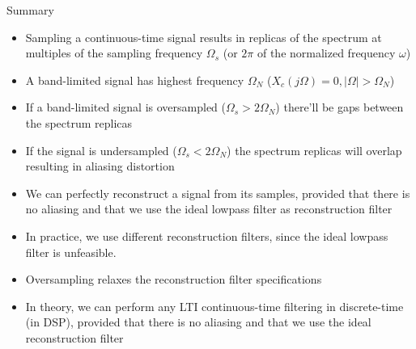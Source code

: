 \documentclass[10pt]{beamer}
\begin{document}
\begin{frame}{Summary}
\begin{itemize}
	\item Sampling a continuous-time signal results in replicas of the spectrum at multiples of the sampling frequency $\Omega_s$ (or $2\pi$ of the normalized frequency $\omega$)
	\item A band-limited signal has highest frequency $\Omega_N$ ($X_c(j\Omega) = 0, |\Omega| > \Omega_N$)
	\item If a band-limited signal is oversampled ($\Omega_s > 2\Omega_N$) there'll be gaps between the spectrum replicas
	\item If the signal is undersampled ($\Omega_s < 2\Omega_N$) the spectrum replicas will overlap resulting in aliasing distortion
	\item We can perfectly reconstruct a signal from its samples, provided that there is no aliasing and that we use the ideal lowpass filter as reconstruction filter
	\item In practice, we use different reconstruction filters, since the ideal lowpass filter is unfeasible.
	\item Oversampling relaxes the reconstruction filter specifications
	\item In theory, we can perform any LTI continuous-time filtering in discrete-time (in DSP), provided that there is no aliasing and that we use the ideal reconstruction filter
\end{itemize}

\end{frame}
\end{document}
